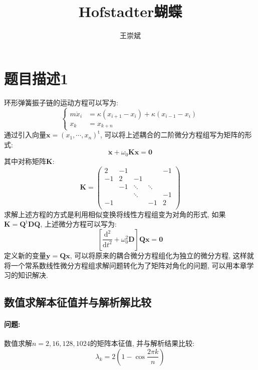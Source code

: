 \documentclass[a4paper,zihao=5,UTF8]{ctexart}
\title{\textbf{Hofstadter蝴蝶}}
\author{王崇斌\;1800011716}
\def\d{\mathrm{d}}
\newcommand{\mr}[1]{\mathrm{#1}}
\newcommand{\mb}[1]{\mathbf{#1}}
\begin{document}
	\pagestyle{fancy}
	\pagestyle{fancy}
	\chead{}
	\rhead{\today}
	\maketitle
    \thispagestyle{fancy}
    \tableofcontents
    \section{题目描述1}
	环形弹簧振子链的运动方程可以写为:
	\begin{equation}
		\left\{
			\begin{aligned}
				m\ddot{x}_{i} &= \kappa(x_{i+1} - x_{i}) + \kappa(x_{i - 1} - x_{i})\\
				x_{k} &= x_{k + n}
			\end{aligned}
		\right.
	\end{equation}
    通过引入向量$\bm{x} = (x_1, \cdots, x_n)^{\mr{t}}$, 可以将上述耦合的二阶微分方程组写为矩阵的形式:
	\begin{equation}
		\ddot{\bm{x}} + \omega_0 \mb{K}\bm{x} = \mb{0}
	\end{equation}
	其中对称矩阵$\mb{K}$:
	\begin{equation}
		\mb{K} = 
		\begin{pmatrix}
			2 & -1 &  & & -1\\
			-1 & 2 & -1 & & \\
			& -1 & \ddots & \ddots & \\
			 & & \ddots & &-1\\
			 -1 & & & -1 & 2\\
		\end{pmatrix}
	\end{equation}
	求解上述方程的方式是利用相似变换将线性方程组变为对角的形式, 如果$\mb{K} = \mb{Q}^{\mr{t}}\mb{D}\mb{Q}$, 
	上述微分方程可以写为:
	\begin{equation}
		\left[\frac{\d^2}{\d t^2} + \omega_0^2\mb{D}\right]\mb{Q}\bm{x} = \mb{0}
	\end{equation}
	定义新的变量$\bm{y} = \mb{Q}\bm{x}$, 可以将原来的耦合微分方程组化为独立的微分方程, 
	这样就将一个常系数线性微分方程组求解问题转化为了矩阵对角化的问题, 可以用本章学习的知识解决.
	\subsection{数值求解本征值并与解析解比较}
	\paragraph{问题:}数值求解$n=2, 16, 128, 1024$的矩阵本征值, 并与解析结果比较:
	\begin{equation}
		\lambda_k = 2\left(1 - \cos\frac{2\pi k}{n}\right)
	\end{equation}
\end{document}
